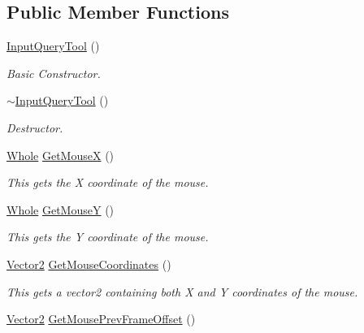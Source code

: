 \subsection*{Public Member Functions}
\begin{DoxyCompactItemize}
\item 
\hyperlink{classphys_1_1InputQueryTool_a10a997ec2e072d31808c794542c0516f}{InputQueryTool} ()
\begin{DoxyCompactList}\small\item\em Basic Constructor. \item\end{DoxyCompactList}\item 
\hyperlink{classphys_1_1InputQueryTool_a6a37616800928b691932045ba34759b8}{$\sim$InputQueryTool} ()
\begin{DoxyCompactList}\small\item\em Destructor. \item\end{DoxyCompactList}\item 
\hyperlink{namespacephys_a460f6bc24c8dd347b05e0366ae34f34a}{Whole} \hyperlink{classphys_1_1InputQueryTool_a706c05a974dff509c61440f63bbe9d2d}{GetMouseX} ()
\begin{DoxyCompactList}\small\item\em This gets the X coordinate of the mouse. \item\end{DoxyCompactList}\item 
\hyperlink{namespacephys_a460f6bc24c8dd347b05e0366ae34f34a}{Whole} \hyperlink{classphys_1_1InputQueryTool_acbf87969054ab02e2a7bfc66d9cd4bdd}{GetMouseY} ()
\begin{DoxyCompactList}\small\item\em This gets the Y coordinate of the mouse. \item\end{DoxyCompactList}\item 
\hyperlink{classphys_1_1Vector2}{Vector2} \hyperlink{classphys_1_1InputQueryTool_affd9523f67b542b208e6d36c3395e72b}{GetMouseCoordinates} ()
\begin{DoxyCompactList}\small\item\em This gets a vector2 containing both X and Y coordinates of the mouse. \item\end{DoxyCompactList}\item 
\hyperlink{classphys_1_1Vector2}{Vector2} \hyperlink{classphys_1_1InputQueryTool_aea2da0aeb97353f9d7af75f2a8cb7d91}{GetMousePrevFrameOffset} ()

\end{DoxyCompactItemize}
